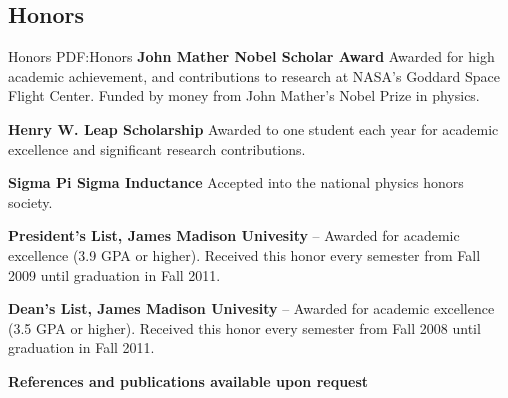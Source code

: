 \documentclass[letterpaper,MMMyyyy,nonstop]{simpleresumecv}
\begin{document}
\begin{body}

\section
{Honors}
{Honors}
{PDF:Honors}
\textbf{John Mather Nobel Scholar Award}
\hfill
{}
\BulletItem
Awarded for high academic achievement, and contributions to research at NASA's Goddard Space Flight Center.  Funded by money from John Mather's Nobel Prize in physics.


\textbf{Henry W. Leap Scholarship}
\hfill
{}
\BulletItem
Awarded to one student each year for academic excellence and significant research contributions.

\textbf{Sigma Pi Sigma Inductance}
\hfill
{}
\BulletItem
Accepted into the national physics honors society.

\textbf{President's List, James Madison Univesity}
\hfill
{} -- 
\BulletItem
Awarded for academic excellence (3.9 GPA or higher).  Received this honor every semester from Fall 2009 until graduation in Fall 2011.

\textbf{Dean's List, James Madison Univesity}
\hfill
{} --
\BulletItem
Awarded for academic excellence (3.5 GPA or higher).  Received this honor every semester from Fall 2008 until graduation in Fall 2011.

\BigGap
\Gap
\textbf{ References and publications available upon request}
\end{body}
\end{document}
